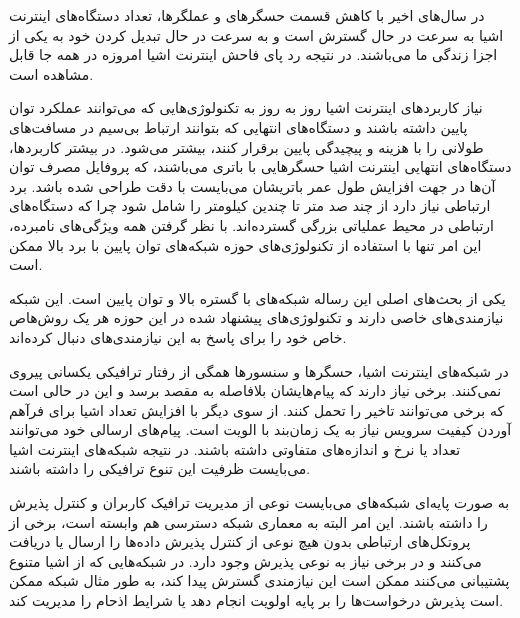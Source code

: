 

در سال‌های اخیر با کاهش قسمت حسگرهای و عملگرها، تعداد دستگاه‌های اینترنت اشیا به سرعت در حال گسترش است و به سرعت در حال تبدیل کردن خود به یکی از اجزا زندگی ما می‌باشند.
در نتیجه رد پای فاحش اینترنت اشیا امروزه در همه جا قابل مشاهده است.


نیاز کاربردهای اینترنت اشیا روز به روز به تکنولوژی‌هایی که می‌توانند عملکرد توان پایین داشته باشند
و دستگاه‌های انتهایی که بتوانند ارتباط بی‌سیم در مسافت‌های طولانی را با هزینه و پیچیدگی پایین برقرار کنند، بیشتر می‌شود.
در بیشتر کاربردها، دستگاه‌های انتهایی اینترنت اشیا حسگرهایی با باتری می‌باشند، که پروفایل مصرف توان آن‌ها در جهت افزایش طول عمر
باتریشان می‌بایست با دقت طراحی شده باشد.
برد ارتباطی نیاز دارد از چند صد متر تا چندین کیلومتر را شامل شود چرا که دستگاه‌های ارتباطی در محیط عملیاتی بزرگی گسترده‌اند.
با نظر گرفتن همه ویژگی‌های نامبرده، این امر تنها با استفاده از تکنولوژی‌های حوزه شبکه‌های توان پایین با برد بالا ممکن است.


یکی از بحث‌های اصلی این رساله شبکه‌های با گستره بالا و توان پایین است. این شبکه نیازمندی‌های خاصی دارند و تکنولوژی‌های پیشنهاد شده در این حوزه
هر یک روش‌هاص خاص خود را برای پاسخ به این نیازمندی‌های دنبال کرده‌اند.


در شبکه‌های اینترنت اشیا، حسگرها و سنسورها همگی از رفتار ترافیکی یکسانی پیروی نمی‌کنند. برخی نیاز دارند که پیام‌هایشان بلافاصله به مقصد برسد و این در حالی است که برخی می‌توانند تاخیر را تحمل کنند.
از سوی دیگر با افزایش تعداد اشیا برای فرآهم آوردن کیفیت سرویس نیاز به یک زمان‌بند با الویت است. پیام‌های ارسالی خود می‌توانند تعداد یا نرخ و اندازه‌های متفاوتی داشته باشند.
در نتیجه شبکه‌های اینترنت اشیا می‌بایست ظرفیت این تنوع ترافیکی را داشته باشند.

به صورت پایه‌ای شبکه‌های می‌بایست نوعی از مدیریت ترافیک کاربران و کنترل پذیرش را داشته باشند.
این امر البته به معماری شبکه دسترسی هم وابسته است، برخی از پروتکل‌های ارتباطی بدون هیچ نوعی از کنترل پذیرش
داده‌ها را ارسال یا دریافت می‌کنند و در برخی نیاز به نوعی پذیرش وجود دارد.
در شبکه‌هایی که از اشیا متنوع پشتیبانی می‌کنند ممکن است این نیازمندی گسترش پیدا کند، به طور مثال
شبکه ممکن است پذیرش درخواست‌ها را بر پایه اولویت انجام دهد یا شرایط اذحام را مدیریت کند.

